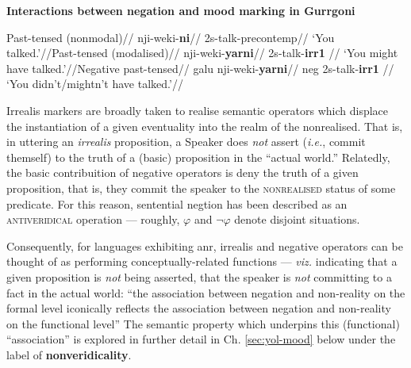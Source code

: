 	\pex{}
\textbf{Interactions between negation and mood marking in Gurrgoni} 

\a\begingl\glpreamble Past-tensed (nonmodal)//
\gla nji-weki-\textbf{ni}//
\glb 2s-talk-\gls{precontemp}//
\glft `You talked.'//\endgl \a\begingl\glpreamble Past-tensed (modalised)//
\gla nji-weki-\textbf{yarni}//
\glb 2s-talk-\textbf{\gls{irr}1}  //
\glft `You might have talked.'//\endgl	\a\begingl\glpreamble Negative past-tensed//
\gla galu nji-weki-\textbf{yarni}//
\glb \gls{neg} 2s-talk-\textbf{\gls{irr}1} //
\glft `You didn't/mightn't have talked.'//\endgl


\xe



Irrealis markers are broadly taken to realise semantic operators which displace the instantiation of a given eventuality into the realm of the nonrealised. That is, in uttering an \textit{irrealis} proposition, a Speaker does \textit{not} assert (\textit{i.e.}, commit themself) to the truth of a (basic) proposition in the ``actual world.'' Relatedly, the basic contribuition of negative operators is deny the truth of a given proposition, that is, they commit the speaker to the \textsc{nonrealised} status of some predicate. For this reason, sentential negtion has been described as an \textsc{antiveridical} operation --- roughly, $ \varphi $ and $ \neg\varphi $ denote disjoint situations.

Consequently, for languages exhibiting \acrshort{anr}, irrealis and negative operators can be thought of as performing conceptually-related functions --- \textit{viz.} indicating that a given proposition is \textit{not} being asserted, that the speaker is \textit{not} committing to a fact in the actual world: ``the association between negation and non-reality on the formal level iconically reflects the association between negation and non-reality on the functional level'' \citetext{\citealp[208]{Miestamo2005}, see also \citealp{Horn2001,Givon1975} a.o.} The semantic property which underpins this (functional) ``association'' is explored in further detail in Ch. \ref{sec:yol-mood} below under the label of \textbf{nonveridicality}.

